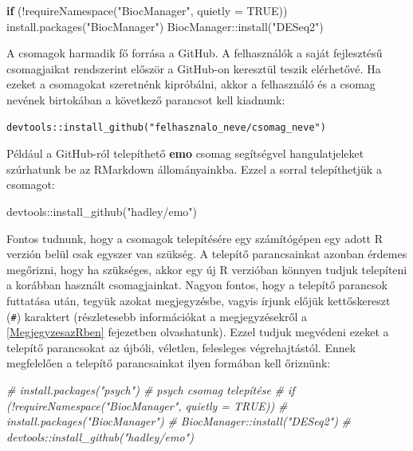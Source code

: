 \documentclass[
]{book}
\newenvironment{Shaded}{\begin{snugshade}}{\end{snugshade}}
\newcommand{\AttributeTok}[1]{\textcolor[rgb]{0.77,0.63,0.00}{#1}}
\newcommand{\CommentTok}[1]{\textcolor[rgb]{0.56,0.35,0.01}{\textit{#1}}}
\newcommand{\ConstantTok}[1]{\textcolor[rgb]{0.00,0.00,0.00}{#1}}
\newcommand{\ControlFlowTok}[1]{\textcolor[rgb]{0.13,0.29,0.53}{\textbf{#1}}}
\newcommand{\FunctionTok}[1]{\textcolor[rgb]{0.00,0.00,0.00}{#1}}
\newcommand{\NormalTok}[1]{#1}
\newcommand{\SpecialCharTok}[1]{\textcolor[rgb]{0.00,0.00,0.00}{#1}}
\newcommand{\StringTok}[1]{\textcolor[rgb]{0.31,0.60,0.02}{#1}}
\begin{document}
\begin{Shaded}
\begin{Highlighting}[]
\ControlFlowTok{if}\NormalTok{ (}\SpecialCharTok{!}\FunctionTok{requireNamespace}\NormalTok{(}\StringTok{"BiocManager"}\NormalTok{, }\AttributeTok{quietly =} \ConstantTok{TRUE}\NormalTok{))}
    \FunctionTok{install.packages}\NormalTok{(}\StringTok{"BiocManager"}\NormalTok{)}
\NormalTok{BiocManager}\SpecialCharTok{::}\FunctionTok{install}\NormalTok{(}\StringTok{"DESeq2"}\NormalTok{)}
\end{Highlighting}
\end{Shaded}

A csomagok harmadik fő forrása a GitHub. A felhasználók a saját fejlesztésű csomagjaikat rendszerint először a GitHub-on keresztül teszik elérhetővé. Ha ezeket a csomagokat szeretnénk kipróbálni, akkor a felhasználó és a csomag nevének birtokában a következő parancsot kell kiadnunk:

\begin{verbatim}
devtools::install_github("felhasznalo_neve/csomag_neve")
\end{verbatim}

Például a GitHub-ról telepíthető \textbf{emo} csomag segítségvel hangulatjeleket szúrhatunk be az RMarkdown állományainkba. Ezzel a sorral telepíthetjük a csomagot:

\begin{Shaded}
\begin{Highlighting}[]
\NormalTok{devtools}\SpecialCharTok{::}\FunctionTok{install\_github}\NormalTok{(}\StringTok{"hadley/emo"}\NormalTok{)}
\end{Highlighting}
\end{Shaded}

Fontos tudnunk, hogy a csomagok telepítésére egy számítógépen egy adott R verzión belül csak egyszer van szükség. A telepítő parancsainkat azonban érdemes megőrizni, hogy ha szükséges, akkor egy új R verzióban könnyen tudjuk telepíteni a korábban használt csomagjainkat. Nagyon fontos, hogy a telepítő parancsok futtatása után, tegyük azokat megjegyzésbe, vagyis írjunk előjük kettőskereszt (\texttt{\#}) karaktert (részletesebb információkat a megjegyzésekről a \ref{MegjegyzesazRben} fejezetben olvashatunk). Ezzel tudjuk megvédeni ezeket a telepítő parancsokat az újbóli, véletlen, felesleges végrehajtástól. Ennek megfelelően a telepítő parancsainkat ilyen formában kell őriznünk:

\begin{Shaded}
\begin{Highlighting}[]
\CommentTok{\# install.packages("psych")        \# psych csomag telepítése}
\CommentTok{\# if (!requireNamespace("BiocManager", quietly = TRUE))}
\CommentTok{\#     install.packages("BiocManager")}
\CommentTok{\# BiocManager::install("DESeq2")}
\CommentTok{\# devtools::install\_github("hadley/emo")}
\end{Highlighting}
\end{Shaded}
\end{document}

